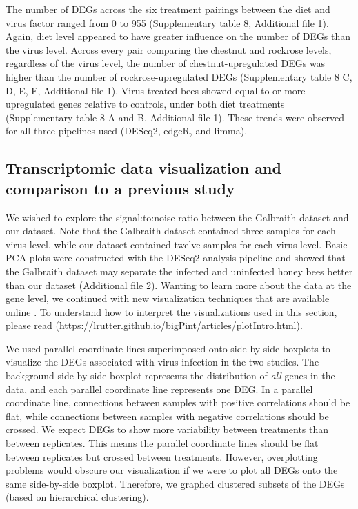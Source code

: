 \documentclass{bmcart}
\begin{document}
\begin{linenumbers}
\begin{doublespacing}
The number of DEGs across the six treatment pairings between the diet and virus factor ranged from 0 to 955 (Supplementary table 8, Additional file 1). Again, diet level appeared to have greater influence on the number of DEGs than the virus level. Across every pair comparing the chestnut and rockrose levels, regardless of the virus level, the number of chestnut-upregulated DEGs was higher than the number of rockrose-upregulated DEGs (Supplementary table 8 C, D, E, F, Additional file 1). Virus-treated bees showed equal to or more upregulated genes relative to controls, under both diet treatments (Supplementary table 8 A and B, Additional file 1). These trends were observed for all three pipelines used (DESeq2, edgeR, and limma).

\subsection*{Transcriptomic data visualization and comparison to a previous study}

We wished to explore the signal:to:noise ratio between the Galbraith dataset and our dataset. Note that the Galbraith dataset contained three samples for each virus level, while our dataset contained twelve samples for each virus level. Basic PCA plots were constructed with the DESeq2 analysis pipeline and showed that the Galbraith dataset may separate the infected and uninfected honey bees better than our dataset (Additional file 2). Wanting to learn more about the data at the gene level, we continued with new visualization techniques that are available online \cite{bigpint}. To understand how to interpret the visualizations used in this section, please read (https://lrutter.github.io/bigPint/articles/plotIntro.html).

We used parallel coordinate lines superimposed onto side-by-side boxplots to visualize the DEGs associated with virus infection in the two studies. The background side-by-side boxplot represents the distribution of \textit{all} genes in the data, and each parallel coordinate line represents one DEG. In a parallel coordinate line, connections between samples with positive correlations should be flat, while connections between samples with negative correlations should be crossed. We expect DEGs to show more variability between treatments than between replicates. This means the parallel coordinate lines should be flat between replicates but crossed between treatments. However, overplotting problems would obscure our visualization if we were to plot all DEGs onto the same side-by-side boxplot. Therefore, we graphed clustered subsets of the DEGs (based on hierarchical clustering).


\end{doublespacing}
\end{linenumbers}
\end{document}
